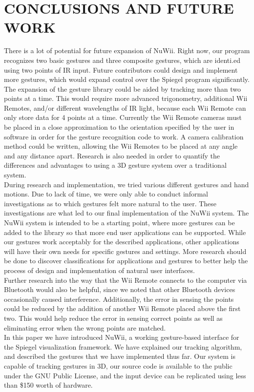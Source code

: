 \documentclass[a4paper,twoside]{article}
\begin{document}
\section{\uppercase{Conclusions and Future Work}} There is a lot of potential
for future expansion of NuWii. Right now, our program recognizes two basic
gestures and three composite gestures, which are identi.ed using two points of
IR input. Future contributors could design and implement more gestures, which
would expand control over the Spiegel program significantly. The expansion of
the gesture library could be aided by tracking more than two points at a time.
This would require more advanced trigonometry, additional Wii Remotes, and/or
different wavelengths of IR light, because each Wii Remote can only store data
for 4 points at a time. Currently the Wii Remote cameras must be placed in a
close approximation to the orientation specified by the user in software in
order for the gesture recognition code to work. A camera calibration method
could be written, allowing the Wii Remotes to be placed at any angle and any
distance apart.  Research is also needed in order to quantify the differences
and advantages to using a 3D gesture system over a traditional system. \\
    During research and implementation, we tried various different gestures and
hand motions. Due to lack of time, we were only able to conduct informal
investigations as to which gestures felt more natural to the user. These
investigations are what led to our final implementation of the NuWii system.
The NuWii system is intended to be a starting point, where more gestures can be
added to the library so that more end user applications can be supported. While
our gestures work acceptably for the described applications, other applications
will have their own needs for specific gestures and settings. More research
should be done to discover classifications for applications and gestures to
better help the process of design and implementation of natural user
interfaces.\\ 
    Further research into the way that the Wii Remote connects to the
computer via Bluetooth would also be helpful, since we noted that other
Bluetooth devices occasionally caused interference. Additionally, the error in
sensing the points could be reduced by the addition of another Wii Remote placed
above the first two. This would help reduce the error in sensing correct points
as well as eliminating error when the wrong points are matched.\\ 
    In this paper we have introduced NuWii, a working gesture-based interface for
the Spiegel visualization framework. We have explained our tracking algorithm,
and described the gestures that we have implemented thus far. Our system is
capable of tracking gestures in 3D, our source code is available to the public
under the GNU Public License, and the input device can be replicated using less
than \$150 worth of hardware. 
    
\end{document}
